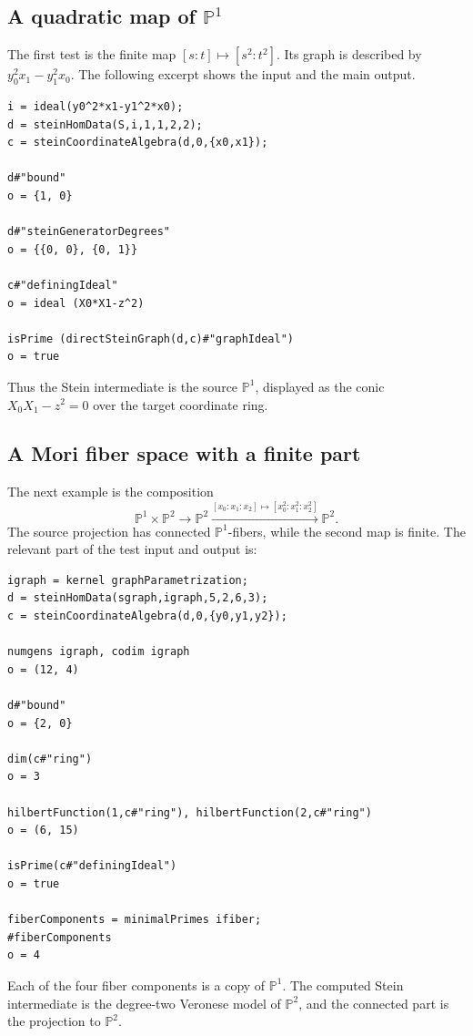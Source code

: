 \documentclass[a4paper,11pt]{article}
\begin{document}
\subsection{A quadratic map of $\mathbb{P}^1$}

The first test is the finite map $[s:t]\mapsto[s^2:t^2]$. Its graph is described by
$y_0^2x_1-y_1^2x_0$. The following excerpt shows the input and the main output.

\begin{verbatim}
i = ideal(y0^2*x1-y1^2*x0);
d = steinHomData(S,i,1,1,2,2);
c = steinCoordinateAlgebra(d,0,{x0,x1});

d#"bound"
o = {1, 0}

d#"steinGeneratorDegrees"
o = {{0, 0}, {0, 1}}

c#"definingIdeal"
o = ideal (X0*X1-z^2)

isPrime (directSteinGraph(d,c)#"graphIdeal")
o = true
\end{verbatim}

Thus the Stein intermediate is the source $\mathbb{P}^1$, displayed as the conic
$X_0X_1-z^2=0$ over the target coordinate ring.

\subsection{A Mori fiber space with a finite part}

The next example is the composition
\[
 \mathbb{P}^1\times\mathbb{P}^2\longrightarrow\mathbb{P}^2
 \xrightarrow{[x_0:x_1:x_2]\mapsto[x_0^2:x_1^2:x_2^2]}
 \mathbb{P}^2.
\]
The source projection has connected $\mathbb{P}^1$-fibers, while the second map is
finite. The relevant part of the test input and output is:

\begin{verbatim}
igraph = kernel graphParametrization;
d = steinHomData(sgraph,igraph,5,2,6,3);
c = steinCoordinateAlgebra(d,0,{y0,y1,y2});

numgens igraph, codim igraph
o = (12, 4)

d#"bound"
o = {2, 0}

dim(c#"ring")
o = 3

hilbertFunction(1,c#"ring"), hilbertFunction(2,c#"ring")
o = (6, 15)

isPrime(c#"definingIdeal")
o = true

fiberComponents = minimalPrimes ifiber;
#fiberComponents
o = 4
\end{verbatim}

Each of the four fiber components is a copy of $\mathbb{P}^1$. The computed Stein
intermediate is the degree-two Veronese model of $\mathbb{P}^2$, and the connected part
is the projection to $\mathbb{P}^2$.
\end{document}
